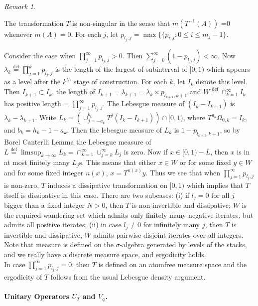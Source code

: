 \documentclass{amsart}
\theoremstyle{definition}
\theoremstyle{remark}
\newtheorem{rem}[Th]{Remark}
\numberwithin{equation}{section}
\newcommand{\egdef}{\stackrel{\textrm {def}}{=}}
\newcommand{\1}{\mathbb{1}}
\begin{document}
\begin{rem}\label{rem2}

 The transformation $T$ is non-singular in the sense that $m(T^{-1}(A))$ =$ 0$ whenever $m(A) =0$.
For each $j$, let $p_{l_j, j} = \max\{\{p_{i,j}: 0 \leq i\leq m_j-1\}$.

Consider the case when $\prod_{j=1}^\infty p_{l_j,j} > 0$. Then $\sum_{j=0}^\infty (1 - p_{l_j,j}) < \infty$. Now $\lambda_k \egdef \prod_{j=1}^k p_{l_j,j}$ is the length of the largest of subinterval of $[0,1)$ which appears as a level after the $k^{th}$ stage of construction. For each $k$, let $I_k$ denote this level. Then $I_{k+1} \subset I_k$,
the length of $I_{k+1} = \lambda_{k+1} = \lambda_k\times p_{l_{k+1}, k+1}$ and $W \egdef \cap_{k=1}^\infty I_k$ has positive length = $\prod_{j=1}^\infty p_{l_j, j}$. The Lebesgue measure of $ (I_k - I_{k+1})$ is $\lambda_k - \lambda_{k+1}$. Write $L_k = (\cup_{j= -a_k}^{b_k}T^j(I_k- I_{k+1}))\cap [0,1)$, where $T^{a_k}\Omega_{0,k} = I_k$, and $b_k = h_k-1 - a_k$.
Then the lebesgue measure of $L_k$ is $1 - p_{l_{k+1}, k+1}$, so by Borel Canterlli Lemma
the Lebesgue measure of $L \egdef \limsup_{k\rightarrow \infty} L_k = \cap_{k=1}^\infty\cup_{j=k}^\infty L_j$ is zero. Now if $x \in [0,1) - L$, then $x$ is in at most finitely many $L_j$s.
This means that either $x \in W$ or for some fixed $y\in W$ and for some fixed integer $n(x)$, $x = T^{n(x)}y$. Thus we see that when $\prod_{j=1}^\infty p_{l_j,j}$is non-zero,
$T$ induces a dissipative transformation on $[0,1)$ which implies that $T$ itself is dissipative in this case. There are two subcases: (i) if $l_j =0$ for all $j$ bigger than a fixed  integer $N >0$, then $T$ is non-invertible and dissipative; $W$ is the required wandering set which admits only finitely many negative iterates, but admits all positive iterates; (ii) in case $l_j \neq 0$
for infinitely many $j$, then $T $ is invertible and dissipative, $W$ admits pairwise disjoint iterates over all integers. Note that measure is defined on the
$\sigma$-algebra generated by levels of the stacks, and we really have a discrete measure space, and ergodicity holds.\\

In case $\prod_{j=1}^\infty p_{l_j,j} =0$, then $T$ is defined on an atomfree measure space and the ergodicity of $T$ follows from the usual Lebesgue density argument.\\



 \end{rem}
\paragraph{\textbf{Unitary Operators $U_T$ and $V_\phi$.}}
\end{document}
